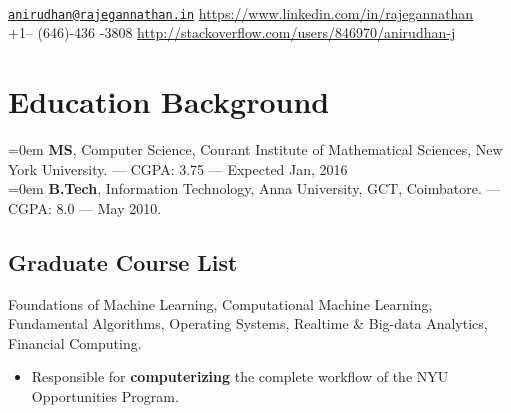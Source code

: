 \documentclass{resume}
\begin{document}
\\
{\href{mailto:anirudhan@rajegannathan.in}{\nolinkurl{anirudhan@rajegannathan.in}} \hfill \url{https://www.linkedin.com/in/rajegannathan}}\\
{+1-- (646)-436 -3808 \hfill \url{http://stackoverflow.com/users/846970/anirudhan-j}}

\section{Education Background}
\noindent \hangindent=0em  \textbf{MS}, Computer Science, Courant Institute of Mathematical Sciences, New York University. --- CGPA\@: 3.75 --- Expected Jan, 2016\\
\noindent \hangindent=0em  \textbf{B.Tech}, Information Technology, Anna University, GCT, Coimbatore. --- CGPA\@: 8.0 --- May 2010.

\subsection{Graduate Course List}
Foundations of Machine Learning, Computational Machine Learning, Fundamental Algorithms, Operating Systems, Realtime \& Big-data Analytics, Financial Computing.

\begin{itemize} \itemsep1pt \parskip0pt
  \item Responsible for \textbf{computerizing} the complete workflow of the NYU Opportunities Program.
\end{itemize}
\end{document}
